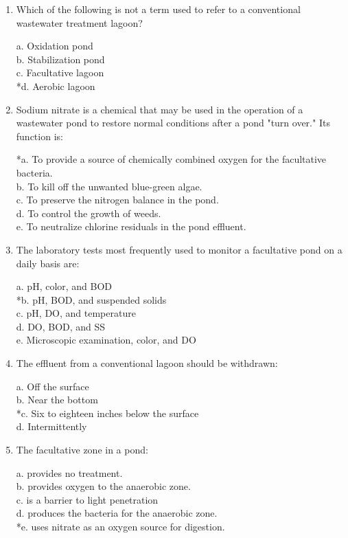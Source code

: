 \begin{enumerate}
\item  Which of the following is not a term used to refer to a conventional wastewater treatment lagoon? 

a. Oxidation pond \\
b. Stabilization pond \\
c. Facultative lagoon \\
*d. Aerobic lagoon 


\item  Sodium nitrate is a chemical that may be used in the operation of a wastewater pond to restore normal conditions after a pond "turn over." Its function is: 

*a. To provide a source of chemically combined oxygen for the facultative bacteria. \\
b. To kill off the unwanted blue-green algae. \\
c. To preserve the nitrogen balance in the pond. \\
d. To control the growth of weeds. \\
e. To neutralize chlorine residuals in the pond effluent. 


\item  The laboratory tests most frequently used to monitor a facultative pond on a daily basis are: 

a. pH, color, and BOD \\
*b. pH, BOD, and suspended solids \\
c. pH, DO, and temperature \\
d. DO, BOD, and SS \\
e. Microscopic examination, color, and DO 


\item  The effluent from a conventional lagoon should be withdrawn: 

a. Off the surface \\
b. Near the bottom \\
*c. Six to eighteen inches below the surface \\
d. Intermittently 


\item  The facultative zone in a pond: 

a. provides no treatment. \\
b. provides oxygen to the anaerobic zone. \\
c. is a barrier to light penetration \\
d. produces the bacteria for the anaerobic zone. \\
*e. uses nitrate as an oxygen source for digestion. 



\end{enumerate}
